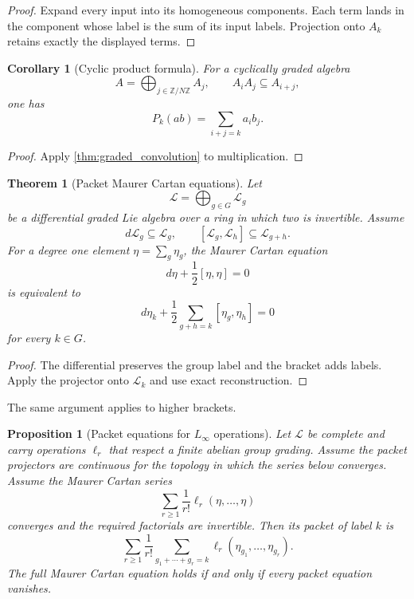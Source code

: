 \documentclass[11pt,a4paper]{article}
\newtheorem{theorem}{Theorem}[section]
\theoremstyle{plain}
\newtheorem{proposition}[proposition]{Proposition}
\newtheorem{corollary}[corollary]{Corollary}
\theoremstyle{definition}
\theoremstyle{remark}
\newcommand{\Lcal}{\mathcal L}
\begin{document}
\begin{proof}
Expand every input into its homogeneous components.  Each term lands in the component whose label is the sum of its input labels.  Projection onto $A_k$ retains exactly the displayed terms.
\end{proof}

\begin{corollary}[Cyclic product formula]\label{cor:cyclic_product}
For a cyclically graded algebra
\[
A=\bigoplus_{j\in\mathbb Z/N\mathbb Z}A_j,
\qquad
A_iA_j\subseteq A_{i+j},
\]
one has
\[
P_k(ab)=
\sum_{i+j=k}a_ib_j.
\]
\end{corollary}

\begin{proof}
Apply \cref{thm:graded_convolution} to multiplication.
\end{proof}

\begin{theorem}[Packet Maurer Cartan equations]\label{thm:packet_mc}
Let
\[
\Lcal=\bigoplus_{g\in G}\Lcal_g
\]
be a differential graded Lie algebra over a ring in which two is invertible.  Assume
\[
d\Lcal_g\subseteq\Lcal_g,
\qquad
[\Lcal_g,\Lcal_h]\subseteq\Lcal_{g+h}.
\]
For a degree one element $\eta=\sum_g\eta_g$, the Maurer Cartan equation
\[
d\eta+\frac12[\eta,\eta]=0
\]
is equivalent to
\[
d\eta_k
+
\frac12
\sum_{g+h=k}[\eta_g,\eta_h]
=0
\]
for every $k\in G$.
\end{theorem}

\begin{proof}
The differential preserves the group label and the bracket adds labels.  Apply the projector onto $\Lcal_k$ and use exact reconstruction.
\end{proof}

The same argument applies to higher brackets.

\begin{proposition}[Packet equations for $L_\infty$ operations]\label{prop:packet_l_infinity}
Let $\Lcal$ be complete and carry operations $\ell_r$ that respect a finite abelian group grading. Assume the packet projectors are continuous for the topology in which the series below converges.  Assume the Maurer Cartan series
\[
\sum_{r\ge1}\frac1{r!}\ell_r(\eta,\ldots,\eta)
\]
converges and the required factorials are invertible.  Then its packet of label $k$ is
\[
\sum_{r\ge1}\frac1{r!}
\sum_{g_1+\cdots+g_r=k}
\ell_r(\eta_{g_1},\ldots,\eta_{g_r}).
\]
The full Maurer Cartan equation holds if and only if every packet equation vanishes.
\end{proposition}
\end{document}
